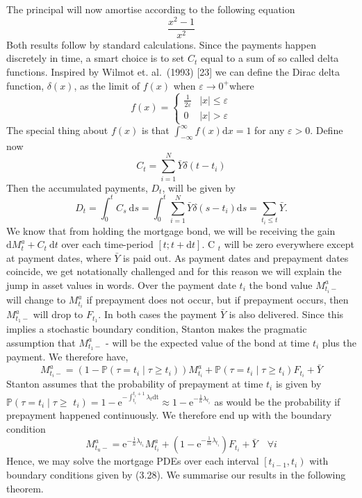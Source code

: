\documentclass[12pt,twoside]{reedthesis}
\begin{document}
The principal will now amortise according to the following equation
\[
\frac{x^{2}-1}{x^{2}}
\]
Both results follow by standard calculations. Since the payments happen discretely in time, a smart choice is to set \(C_{t}\) equal to a sum of so called delta functions. Inspired by Wilmot et. al.~(1993) {[}23{]} we can define the Dirac delta function, \(\delta(x)\), as the limit of \(f(x)\) when \(\varepsilon \rightarrow 0^{+}\)where
\[
f(x)= \begin{cases}\frac{1}{2 \varepsilon} & |x| \leq \varepsilon \\ 0 & |x|>\varepsilon\end{cases}
\]
The special thing about \(f(x)\) is that \(\int_{-\infty}^{\infty} f(x) \mathrm{d} x=1\) for any \(\varepsilon>0\). Define now
\[
C_{t}=\sum_{i=1}^{N} \bar{Y} \delta\left(t-t_{i}\right)
\]
Then the accumulated payments, \(D_{t}\), will be given by
\[
D_{t}=\int_{0}^{t} C_{s} \mathrm{~d} s=\int_{0}^{t} \sum_{i=1}^{N} \bar{Y} \delta\left(s-t_{i}\right) \mathrm{d} s=\sum_{t_{i} \leq t} \bar{Y} .
\]
We know that from holding the mortgage bond, we will be receiving the gain \(\mathrm{d} M_{t}^{a}+C_{t} \mathrm{~d} t\) over each time-period \([t ; t+\mathrm{d} t]\). C \(_{t}\) will be zero everywhere except at payment dates, where \(\bar{Y}\) is paid out. As payment dates and prepayment dates coincide, we get notationally challenged and for this reason we will explain the jump in asset values in words. Over the payment date \(t_{i}\) the bond value \(M_{t_{i}-}^{a}\) will change to \(M_{t_{i}}^{a}\) if prepayment does not occur, but if prepayment occurs, then \(M_{t_{1}-}^{a}\) will drop to \(F_{t_{1}}\). In both cases the payment \(\bar{Y}\) is also delivered. Since this implies a stochastic boundary condition, Stanton makes the pragmatic assumption that \(M_{t_{1}-}^{a}\) - will be the expected value of the bond at time \(t_{i}\) plus the payment. We therefore have,
\[
M_{t_{i}-}^{a}=\left(1-\mathbb{P}\left(\tau=t_{i} \mid \tau \geq t_{i}\right)\right) M_{t_{i}}^{a}+\mathbb{P}\left(\tau=t_{i} \mid \tau \geq t_{i}\right) F_{t_{i}}+\bar{Y}
\]
Stanton assumes that the probability of prepayment at time \(t_{i}\) is given by \(\mathbb{P}\left(\tau=t_{i} \mid \tau \geq\right.\) \(\left.t_{i}\right)=1-\mathrm{e}^{-\int_{t_{i}}^{t_{i}+1} \lambda_{t} \mathrm{dt}} \approx 1-\mathrm{e}^{-\frac{1}{n} \lambda_{t_{i}}}\) as would be the probability if prepayment happened continuously. We therefore end up with the boundary condition
\[
M_{t_{\mathrm{u}}-}^{a}=\mathrm{e}^{-\frac{1}{n} \lambda_{t_{1}}} M_{t_{i}}^{a}+\left(1-\mathrm{e}^{-\frac{1}{m} \lambda_{t_{i}}}\right) F_{t_{i}}+\bar{Y} \quad \forall i
\]
Hence, we may solve the mortgage PDEs over each interval \(\left[t_{i-1}, t_{i}\right)\) with boundary conditions given by (3.28). We summarise our results in the following theorem.
\end{document}
